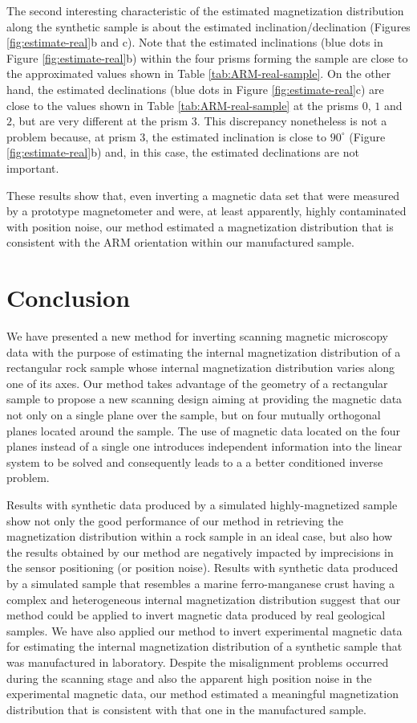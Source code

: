 \documentclass[draft,gc]{agutex}
\begin{document}
\begin{article}
The second interesting characteristic of the estimated magnetization
distribution along the synthetic sample is about the estimated
inclination/declination (Figures \ref{fig:estimate-real}b and c).
Note that the estimated inclinations (blue dots in Figure 
\ref{fig:estimate-real}b) within the four prisms forming
the sample are close to the approximated values shown in Table 
\ref{tab:ARM-real-sample}.
On the other hand, the estimated declinations (blue dots in Figure 
\ref{fig:estimate-real}c) are close to the values shown in Table 
\ref{tab:ARM-real-sample} at the prisms $0$, $1$ and $2$, but are 
very different at the prism $3$.
This discrepancy nonetheless is not a problem because, at prism $3$,
the estimated inclination is close to $90^{\circ}$ (Figure
\ref{fig:estimate-real}b) and, in this case, the estimated declinations
are not important.

These results show that, even inverting a magnetic data set that
were measured by a prototype magnetometer and were, at least apparently,
highly contaminated with position noise, our method estimated a 
magnetization distribution that is consistent with the ARM orientation
within our manufactured sample.

\section{Conclusion}

We have presented a new method for inverting scanning magnetic
microscopy data with the purpose of estimating the internal 
magnetization distribution of a rectangular rock sample whose
internal magnetization distribution varies along one of its
axes.
Our method takes advantage of the geometry of a rectangular sample
to propose a new scanning design aiming at providing the magnetic
data not only on a single plane over the sample, but on four 
mutually orthogonal planes located around the sample.
The use of magnetic data located on the four planes instead
of a single one introduces independent information into the
linear system to be solved and consequently leads to a
a better conditioned inverse problem.

Results with synthetic data produced by a simulated highly-magnetized 
sample show not only the good performance of 
our method in retrieving the magnetization distribution within a 
rock sample in an ideal case, but also how the results obtained by our 
method are negatively impacted by imprecisions in the sensor positioning
(or position noise).
Results with synthetic data produced by a simulated sample that 
resembles a marine ferro-manganese crust having a complex and heterogeneous 
internal magnetization distribution suggest that our method could be
applied to invert magnetic data produced by real geological samples.
We have also applied our method to invert experimental magnetic data
for estimating the internal magnetization 
distribution of a synthetic sample that was manufactured in 
laboratory.
Despite the misalignment problems occurred during the scanning stage
and also the apparent high position noise in the experimental magnetic
data, our method estimated a meaningful magnetization distribution that 
is consistent with that one in the manufactured sample.


\end{article}
\end{document}
